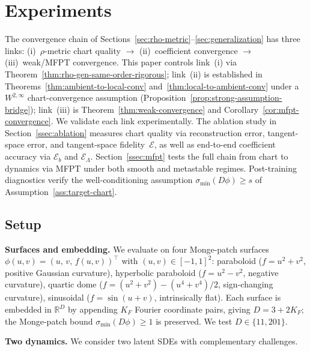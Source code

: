 \documentclass[11pt]{article}
\newcommand{\R}{\mathbb{R}}
\newcommand{\cE}{\mathcal{E}}
\newcommand{\sigmin}{\sigma_{\min}}
\begin{document}
\section{Experiments}\label{sec:experiments}

The convergence chain of
Sections~\ref{sec:rho-metric}--\ref{sec:generalization}
has three links:
(i)~$\rho$-metric chart quality
$\to$ (ii)~coefficient convergence
$\to$ (iii)~weak/MFPT convergence.
This paper controls link~(i) via
Theorem~\ref{thm:rho-gen-same-order-rigorous};
link~(ii) is established in
Theorems~\ref{thm:ambient-to-local-conv}
and~\ref{thm:local-to-ambient-conv} under a
$W^{2,\infty}$ chart-convergence assumption
(Proposition~\ref{prop:strong-assumption-bridge});
link~(iii) is Theorem~\ref{thm:weak-convergence} and
Corollary~\ref{cor:mfpt-convergence}.
We validate each link experimentally.
The ablation study in Section~\ref{ssec:ablation} measures
chart quality via reconstruction error, tangent-space error,
and tangent-space fidelity~$\cE$, as well as end-to-end
coefficient accuracy via $\cE_b$ and $\cE_\Lambda$.
Section~\ref{ssec:mfpt} tests the full chain from
chart to dynamics via MFPT under both smooth and
metastable regimes.
Post-training diagnostics verify the well-conditioning
assumption $\sigmin(D\phi)\ge s$
of Assumption~\ref{ass:target-chart}.

\subsection{Setup}\label{ssec:setup}\label{ssec:surfaces}

\noindent \textbf{Surfaces and embedding.}
We evaluate on four Monge-patch surfaces
$\phi(u,v)=(u,\,v,\,f(u,v))^\top$ with $(u,v)\in[-1,1]^2$:
paraboloid ($f=u^2+v^2$, positive Gaussian curvature),
hyperbolic paraboloid ($f=u^2-v^2$, negative curvature),
quartic dome ($f=(u^2{+}v^2)-(u^4{+}v^4)/2$, sign-changing curvature),
sinusoidal ($f=\sin(u+v)$, intrinsically flat).
Each surface is embedded in $\R^D$ by appending $K_F$
Fourier coordinate pairs, giving $D=3+2K_F$;
the Monge-patch bound $\sigmin(D\phi)\ge 1$ is preserved.
We test $D\in\{11,201\}$.

\noindent \textbf{Two dynamics.}
We consider two latent SDEs with complementary
challenges.
\end{document}
